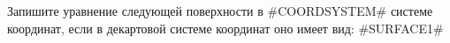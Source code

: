 Запишите уравнение следующей поверхности в #COORDSYSTEM# системе координат, если в декартовой системе координат оно имеет вид:
#SURFACE1#